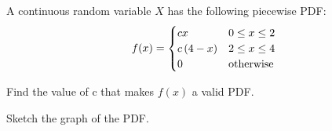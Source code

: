 \documentclass[a4paper, 10pt]{article}
\begin{document}
\begin{problem}
A continuous random variable \( X \) has the following piecewise PDF:
\[
f(x) = \begin{cases}
cx & 0 \leq x \le 2 \\
c\left(4 - x\right) & 2 \leq x \leq 4 \\
0 & \text{otherwise}
\end{cases}
\]
\begin{subproblems}
    \item Find the value of c that makes \( f(x) \) a valid PDF.
    \item Sketch the graph of the PDF.
\end{subproblems}
\end{problem}
\end{document}
